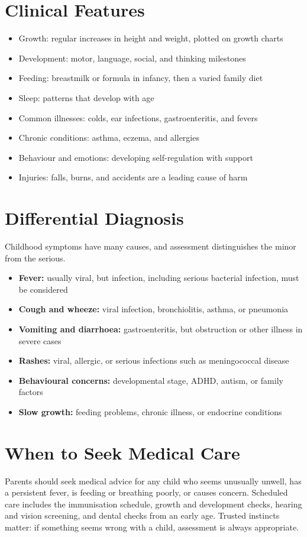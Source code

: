 \section*{Clinical Features}
\begin{itemize}
    \item Growth: regular increases in height and weight, plotted on growth charts
    \item Development: motor, language, social, and thinking milestones
    \item Feeding: breastmilk or formula in infancy, then a varied family diet
    \item Sleep: patterns that develop with age
    \item Common illnesses: colds, ear infections, gastroenteritis, and fevers
    \item Chronic conditions: asthma, eczema, and allergies
    \item Behaviour and emotions: developing self-regulation with support
    \item Injuries: falls, burns, and accidents are a leading cause of harm
\end{itemize}

\section*{Differential Diagnosis}
Childhood symptoms have many causes, and assessment distinguishes the minor from the serious.
\begin{itemize}
    \item \textbf{Fever:} usually viral, but infection, including serious bacterial infection, must be considered
    \item \textbf{Cough and wheeze:} viral infection, bronchiolitis, asthma, or pneumonia
    \item \textbf{Vomiting and diarrhoea:} gastroenteritis, but obstruction or other illness in severe cases
    \item \textbf{Rashes:} viral, allergic, or serious infections such as meningococcal disease
    \item \textbf{Behavioural concerns:} developmental stage, ADHD, autism, or family factors
    \item \textbf{Slow growth:} feeding problems, chronic illness, or endocrine conditions
\end{itemize}

\section*{When to Seek Medical Care}
Parents should seek medical advice for any child who seems unusually unwell, has a persistent fever, is feeding or breathing poorly, or causes concern. Scheduled care includes the immunisation schedule, growth and development checks, hearing and vision screening, and dental checks from an early age. Trusted instincts matter: if something seems wrong with a child, assessment is always appropriate.

